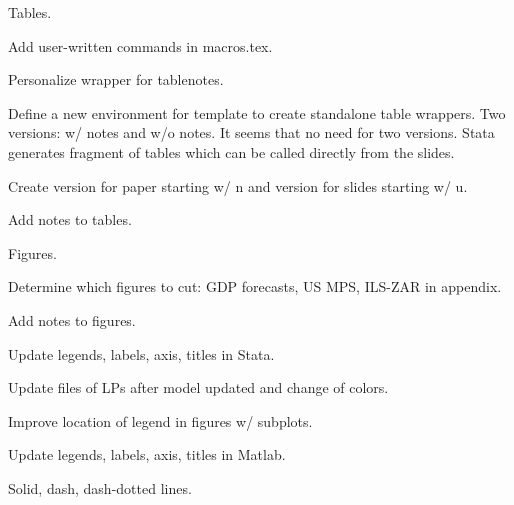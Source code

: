 \documentclass[12pt]{article}
\newcommand{\cmark}{\ding{51}}
\newcommand{\xmark}{\ding{55}}
\newcommand{\done}{\rlap{$\square$}{\raisebox{2pt}{\large\hspace{1pt}\cmark}}%
	\hspace{-2.5pt}}
\newcommand{\wontdo}{\rlap{$\square$}{\large\hspace{1pt}\xmark}}
\begin{document}
\begin{todolist}
	\item[\done] Tables.
	\begin{todolist}
		\item[\done] Add user-written commands in macros.tex.
		\item[\done] Personalize wrapper for tablenotes.
		\item[\wontdo] Define a new environment for template to create standalone table wrappers. Two versions: w/ notes and w/o notes. It seems that no need for two versions. Stata generates fragment of tables which can be called directly from the slides.
		\item[\wontdo] Create version for paper starting w/ n and version for slides starting w/ u.
		\item[\done] Add notes to tables.
	\end{todolist}
	
	\item[\done] Figures.
	\begin{todolist}
		\item[\done] Determine which figures to cut: GDP forecasts, US MPS, ILS-ZAR in appendix.
		\item[\done] Add notes to figures.
		\item[\done] Update legends, labels, axis, titles in Stata.
		\item[\done] Update files of LPs after model updated and change of colors.
		\item[\done] Improve location of legend in figures w/ subplots.
		\item[\done] Update legends, labels, axis, titles in Matlab.
		\item[\done] Solid, dash, dash-dotted lines.
	\end{todolist}
	

\end{todolist}
\end{document}
